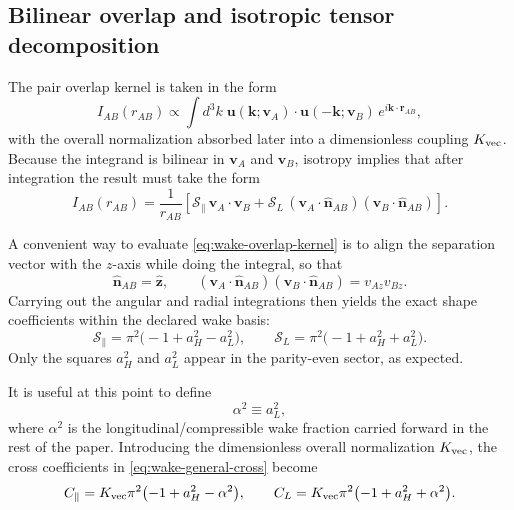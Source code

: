 \documentclass[11pt]{article}
\newcommand{\vct}{\mathbf v}
\begin{document}
\subsection{Bilinear overlap and isotropic tensor decomposition}
\label{sec:wake-overlap}

The pair overlap kernel is taken in the form
\begin{equation}
I_{AB}(r_{AB})
\propto
\int d^3k\;
\mathbf u(\mathbf k;\vct_A)\!\cdot\!\mathbf u(-\mathbf k;\vct_B)\,
e^{i\mathbf k\cdot \mathbf r_{AB}},
\label{eq:wake-overlap-kernel}
\end{equation}
with the overall normalization absorbed later into a dimensionless coupling
\(K_{\rm vec}\). Because the integrand is bilinear in \(\vct_A\) and \(\vct_B\), isotropy
implies that after integration the result must take the form
\begin{equation}
I_{AB}(r_{AB})
=
\frac{1}{r_{AB}}
\left[
\mathcal S_\parallel\,
\vct_A\!\cdot\!\vct_B
+
\mathcal S_L\,
(\vct_A\!\cdot\!\hat{\mathbf n}_{AB})
(\vct_B\!\cdot\!\hat{\mathbf n}_{AB})
\right].
\label{eq:wake-isotropic-decomposition}
\end{equation}

A convenient way to evaluate \eqref{eq:wake-overlap-kernel} is to align the separation
vector with the \(z\)-axis while doing the integral, so that
\begin{equation}
\hat{\mathbf n}_{AB}=\hat{\mathbf z},
\qquad
(\vct_A\!\cdot\!\hat{\mathbf n}_{AB})
(\vct_B\!\cdot\!\hat{\mathbf n}_{AB})
=
v_{Az}v_{Bz}.
\end{equation}
Carrying out the angular and radial integrations then yields the exact shape coefficients
within the declared wake basis:
\begin{equation}
\mathcal S_\parallel
=
\pi^2\bigl(-1+a_H^2-a_L^2\bigr),
\qquad
\mathcal S_L
=
\pi^2\bigl(-1+a_H^2+a_L^2\bigr).
\label{eq:wake-shapes}
\end{equation}
Only the squares \(a_H^2\) and \(a_L^2\) appear in the parity-even sector, as expected.

It is useful at this point to define
\begin{equation}
\alpha^2 \equiv a_L^2,
\label{eq:alpha-from-aL}
\end{equation}
where \(\alpha^2\) is the longitudinal/compressible wake fraction carried forward in the
rest of the paper. Introducing the dimensionless overall normalization \(K_{\rm vec}\),
the cross coefficients in \eqref{eq:wake-general-cross} become
\begin{equation}
C_\parallel
=
K_{\rm vec}\pi^2\bigl(-1+a_H^2-\alpha^2\bigr),
\qquad
C_L
=
K_{\rm vec}\pi^2\bigl(-1+a_H^2+\alpha^2\bigr).
\label{eq:wake-C-parallel-long}
\end{equation}
\end{document}
